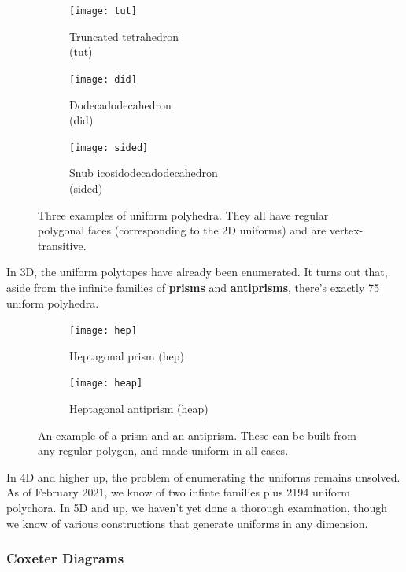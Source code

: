 \documentclass{article}
\begin{document}
\begin{figure}[H]
\centering
\begin{subfigure}{.33333\textwidth}
  \centering
  \texttt{[image: tut]}
  \caption{Truncated tetrahedron\\(tut)}
  \label{fig:tut}
\end{subfigure}%
\begin{subfigure}{.33333\textwidth}
  \centering
  \texttt{[image: did]}
  \caption{Dodecadodecahedron\\(did)}
  \label{fig:did}
\end{subfigure}%
\begin{subfigure}{.33333\textwidth}
  \centering
  \texttt{[image: sided]}
  \caption{Snub icosidodecadodecahedron\\(sided)}
  \label{fig:sided}
\end{subfigure}%
\caption{Three examples of uniform polyhedra. They all have regular polygonal faces (corresponding to the 2D uniforms) and are vertex-transitive.}
\label{fig:uniforms3D}
\end{figure}

In 3D, the uniform polytopes have already been enumerated. It turns out that, aside from the infinite families of \textbf{prisms} and \textbf{antiprisms}, there's exactly 75 uniform polyhedra. %

\begin{figure}[H]
\centering
\begin{subfigure}{.5\textwidth}
  \centering
  \texttt{[image: hep]}
  \caption{Heptagonal prism (hep)}
  \label{fig:hep}
\end{subfigure}%
\begin{subfigure}{.5\textwidth}
  \centering
  \texttt{[image: heap]}
  \caption{Heptagonal antiprism (heap)}
  \label{fig:heap}
\end{subfigure}%
\caption{An example of a prism and an antiprism. These can be built from any regular polygon, and made uniform in all cases.}
\label{fig:prisms}
\end{figure}

In 4D and higher up, the problem of enumerating the uniforms remains unsolved. As of February 2021, we know of two infinte families plus 2194 uniform polychora. In 5D and up, we haven't yet done a thorough examination, though we know of various constructions that generate uniforms in any dimension.

\subsubsection{Coxeter Diagrams}
\end{document}
